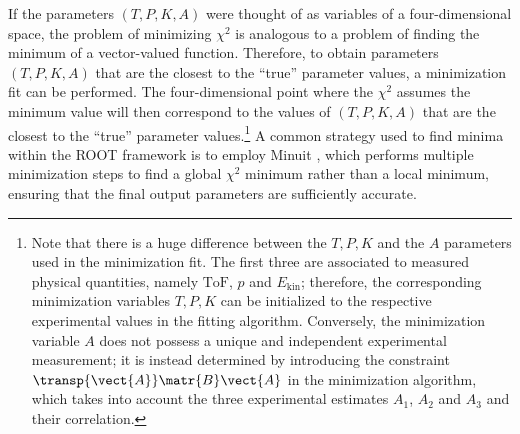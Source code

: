 If the parameters $\left(T,P,K,A\right)$ were thought of as variables of a four-dimensional space, the problem of minimizing $\chi^2$ is analogous to a problem of finding the minimum of a vector-valued function. Therefore, to obtain parameters $\left(T,P,K,A\right)$ that are the closest to the ``true'' parameter values, a minimization fit can be performed. The four-dimensional point where the $\chi^2$ assumes the minimum value will then correspond to the values of $\left(T,P,K,A\right)$ that are the closest to the ``true'' parameter values.\footnote{Note that there is a huge difference between the $T,P,K$ and the $A$ parameters used in the minimization fit. The first three are associated to measured physical quantities, namely $\text{ToF}$, $p$ and $E_\text{kin}$; therefore, the corresponding minimization variables $T,P,K$ can be initialized to the respective experimental values in the fitting algorithm. Conversely, the minimization variable $A$ does not possess a unique and independent experimental measurement; it is instead determined by introducing the constraint $\transp{\vect{A}}\matr{B}\vect{A}$ in the minimization algorithm, which takes into account the three experimental estimates $A_1$, $A_2$ and $A_3$ and their correlation.} A common strategy used to find minima within the ROOT framework \cite{ROOT_framework} is to employ Minuit \cite{JAMES1975343}, which performs multiple minimization steps to find a global $\chi^2$ minimum rather than a local minimum, ensuring that the final output parameters are sufficiently accurate.
